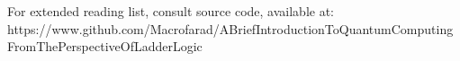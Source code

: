 \documentclass[a4paper]{article}
\begin{document}
\begin{thebibliography}{9}

\end{thebibliography}
\begin{scriptsize}
\textcolor{mygray}{For extended reading list, consult source code, available at: \newline https://www.github.com/Macrofarad/ABriefIntroductionToQuantumComputingFromThePerspectiveOfLadderLogic}

\end{scriptsize} %
\end{document}
